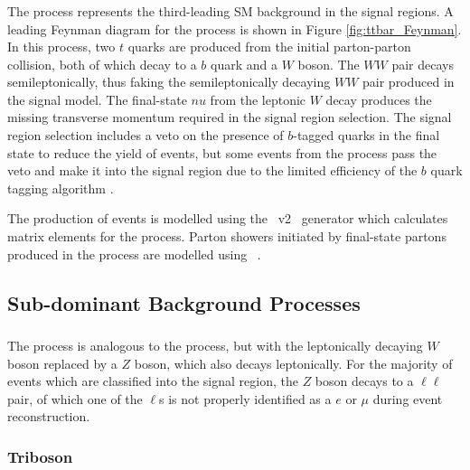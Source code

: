 \subsubsection{\ttbar}
\label{sec:ttbar_description}

The \ttbar process represents the third-leading SM background in the signal regions. A leading Feynman diagram for the process is shown in Figure \ref{fig:ttbar_Feynman}. In this process, two \(t\) quarks are produced from the initial parton-parton collision, both of which decay to a \(b\) quark and a \(W\) boson. The \(WW\) pair decays semileptonically, thus faking the semileptonically decaying \(WW\) pair produced in the signal model. The final-state \(nu\) from the leptonic \(W\) decay produces the missing transverse momentum required in the signal region selection. The signal region selection includes a veto on the presence of \(b\)-tagged quarks in the final state to reduce the yield of \ttbar events, but some events from the process pass the veto and make it into the signal region due to the limited efficiency of the \(b\) quark tagging algorithm \cite{Varni:2742644}.

The production of \ttbar events is modelled using the \POWHEGBOX~v2~\cite{Frixione:2007nw,Nason:2004rx,Frixione:2007vw,Alioli:2010xd} generator which calculates matrix elements for the process. Parton showers initiated by final-state partons produced in the \ttbar process are modelled using ~\cite{Sjostrand:2014zea}. 

\subsection{Sub-dominant Background Processes}

\subsubsection{\zjets}
\label{sec:zjets_description}

The \zjets process is analogous to the \wjets process, but with the leptonically decaying \(W\) boson replaced by a \(Z\) boson, which also decays leptonically. For the majority of \zjets events which are classified into the signal region, the \(Z\) boson decays to a \(\ell\ell\) pair, of which one of the \(\ell\)s is not properly identified as a \(e\) or \(\mu\) during event reconstruction. 

\subsubsection{Triboson}
\label{sec:triboson_description}

